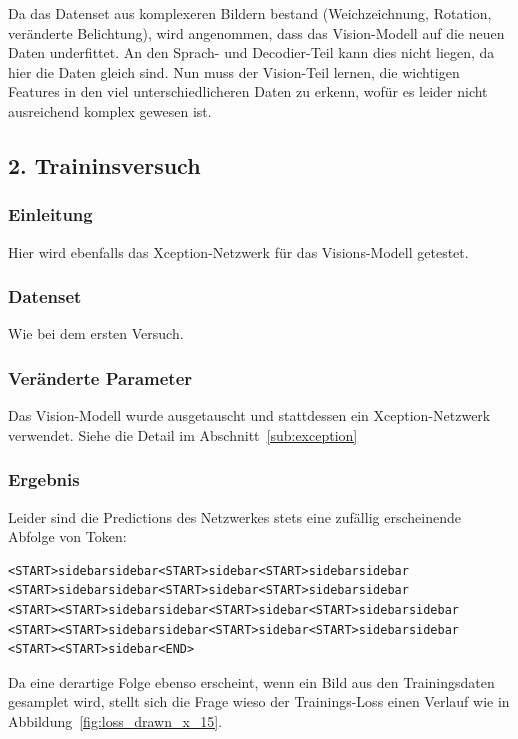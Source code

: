 \documentclass[pdftex,a4paper,halfparskip, article]{scrartcl}
\begin{document}
Da das Datenset aus komplexeren Bildern bestand (Weichzeichnung, Rotation, veränderte Belichtung), wird angenommen, dass das Vision-Modell auf die neuen Daten underfittet. An den Sprach- und Decodier-Teil kann dies nicht liegen, da hier die Daten gleich sind. Nun muss der Vision-Teil lernen, die wichtigen Features in den viel unterschiedlicheren Daten zu erkenn, wofür es leider nicht ausreichend komplex gewesen ist.

\subsection{2. Traininsversuch}

\subsubsection*{Einleitung}

Hier wird ebenfalls das Xception-Netzwerk für das Visions-Modell getestet. 

\subsubsection*{Datenset}

Wie bei dem ersten Versuch.

\subsubsection*{Veränderte Parameter}

Das Vision-Modell wurde ausgetauscht und stattdessen ein Xception-Netzwerk verwendet. Siehe die Detail im Abschnitt~\ref{sub:exception}


\subsubsection*{Ergebnis}

Leider sind die Predictions des Netzwerkes stets eine zufällig erscheinende Abfolge von Token:

\begin{verbatim}
<START>sidebarsidebar<START>sidebar<START>sidebarsidebar
<START>sidebarsidebar<START>sidebar<START>sidebarsidebar
<START><START>sidebarsidebar<START>sidebar<START>sidebarsidebar
<START><START>sidebarsidebar<START>sidebar<START>sidebarsidebar
<START><START>sidebar<END>
\end{verbatim}

Da eine derartige Folge ebenso erscheint, wenn ein Bild aus den Trainingsdaten gesamplet wird, stellt sich die Frage wieso der Trainings-Loss einen Verlauf wie in Abbildung~\ref{fig:loss_drawn_x_15}.
\end{document}
